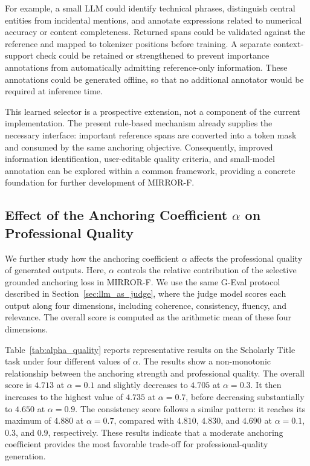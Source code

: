 \documentclass{article} %
\begin{document}
For example, a small LLM could identify technical phrases, distinguish central entities from incidental mentions, and annotate expressions related to numerical accuracy or content completeness. Returned spans could be validated against the reference and mapped to tokenizer positions before training. A separate context-support check could be retained or strengthened to prevent importance annotations from automatically admitting reference-only information. These annotations could be generated offline, so that no additional annotator would be required at inference time.

This learned selector is a prospective extension, not a component of the current implementation. The present rule-based mechanism already supplies the necessary interface: important reference spans are converted into a token mask and consumed by the same anchoring objective. Consequently, improved information identification, user-editable quality criteria, and small-model annotation can be explored within a common framework, providing a concrete foundation for further development of MIRROR-F.




\subsection{Effect of the Anchoring Coefficient $\alpha$ on Professional Quality}
\label{app:alpha_professional_quality}

We further study how the anchoring coefficient $\alpha$ affects the
professional quality of generated outputs. Here, $\alpha$ controls the
relative contribution of the selective grounded anchoring loss in
MIRROR-F. We use the same G-Eval protocol described in
Section~\ref{sec:llm_as_judge}, where the judge model scores each output
along four dimensions, including coherence, consistency, fluency, and
relevance. The overall score is computed as the arithmetic mean of these
four dimensions.

Table~\ref{tab:alpha_quality} reports representative results on the
Scholarly Title task under four different values of $\alpha$. The results
show a non-monotonic relationship between the anchoring strength and
professional quality. The overall score is $4.713$ at $\alpha=0.1$ and
slightly decreases to $4.705$ at $\alpha=0.3$. It then increases to the
highest value of $4.735$ at $\alpha=0.7$, before decreasing substantially
to $4.650$ at $\alpha=0.9$. The consistency score follows a similar
pattern: it reaches its maximum of $4.880$ at $\alpha=0.7$, compared with
$4.810$, $4.830$, and $4.690$ at $\alpha=0.1$, $0.3$, and $0.9$,
respectively. These results indicate that a moderate anchoring coefficient
provides the most favorable trade-off for professional-quality generation.
\end{document}
